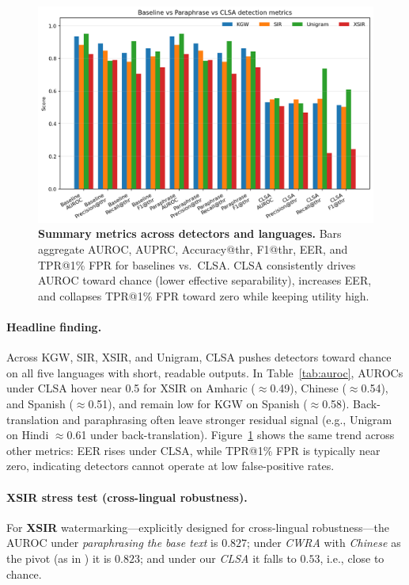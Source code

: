 \documentclass{article}
\begin{document}
\begin{figure}[t]
\centering
\includegraphics[width=\linewidth]{summary_metrics_bars.png}
\caption{\textbf{Summary metrics across detectors and languages.} Bars aggregate AUROC, AUPRC, Accuracy@thr, F1@thr, EER, and TPR@1\% FPR for baselines vs.\ CLSA. CLSA consistently drives AUROC toward chance (lower effective separability), increases EER, and collapses TPR@1\% FPR toward zero while keeping utility high.}
\label{fig:summary-bars}
\end{figure}

\paragraph{Headline finding.}
Across KGW, SIR, XSIR, and Unigram, CLSA pushes detectors toward chance on all five languages with short, readable outputs. In Table~\ref{tab:auroc}, AUROCs under CLSA hover near 0.5 for XSIR on Amharic ($\approx$0.49), Chinese ($\approx$0.54), and Spanish ($\approx$0.51), and remain low for KGW on Spanish ($\approx$0.58). Back-translation and paraphrasing often leave stronger residual signal (e.g., Unigram on Hindi $\approx$0.61 under back-translation). Figure~\ref{fig:summary-bars} shows the same trend across other metrics: EER rises under CLSA, while TPR@1\% FPR is typically near zero, indicating detectors cannot operate at low false-positive rates.

\paragraph{XSIR stress test (cross-lingual robustness).}
For \textbf{XSIR} watermarking—explicitly designed for cross-lingual robustness—the AUROC under \emph{paraphrasing the base text} is $0.827$; under \emph{CWRA} with \emph{Chinese} as the pivot (as in \citet{He2024cwra}) it is $0.823$; and under our \emph{CLSA} it falls to $0.53$, i.e., close to chance.
\end{document}
